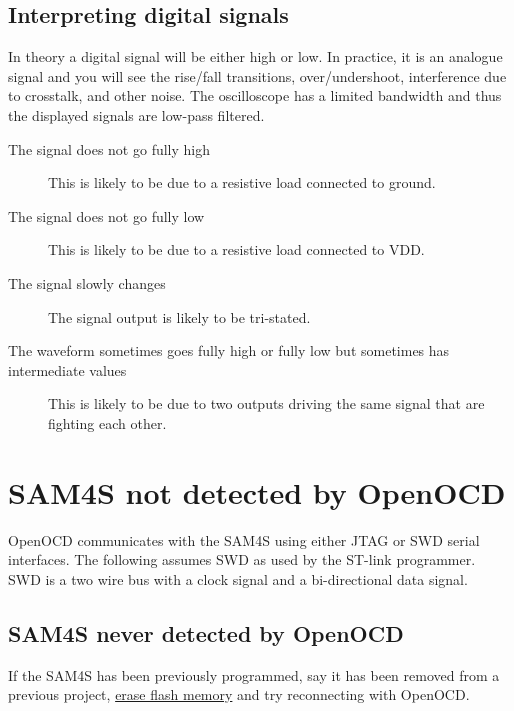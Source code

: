 \subsection{Interpreting digital signals}

In theory a digital signal will be either high or low.  In practice,
it is an analogue signal and you will see the rise/fall transitions,
over/undershoot, interference due to crosstalk, and other noise.  The
oscilloscope has a limited bandwidth and thus the displayed signals
are low-pass filtered.

\begin{description}
  \item[The signal does not go fully high] This is likely to be due to
    a resistive load connected to ground.

  \item[The signal does not go fully low] This is likely to be due to
    a resistive load connected to VDD.

  \item[The signal slowly changes] The signal output is likely to be
    tri-stated.

  \item[The waveform sometimes goes fully high or fully low but
    sometimes has intermediate values] This is likely to be due to two
    outputs driving the same signal that are fighting each other.
\end{description}



\section{SAM4S not detected by OpenOCD}
\label{sam4s-not-detected-by-openocd}

OpenOCD communicates with the SAM4S using either JTAG or SWD serial
interfaces.  The following assumes SWD as used by the ST-link
programmer.  SWD is a two wire bus with a clock signal and a
bi-directional data signal.


\subsection{SAM4S never detected by OpenOCD}

If the SAM4S has been previously programmed, say it has been removed
from a previous project, \hyperref[erasing-flash-memory]{erase flash
  memory} and try reconnecting with OpenOCD.

